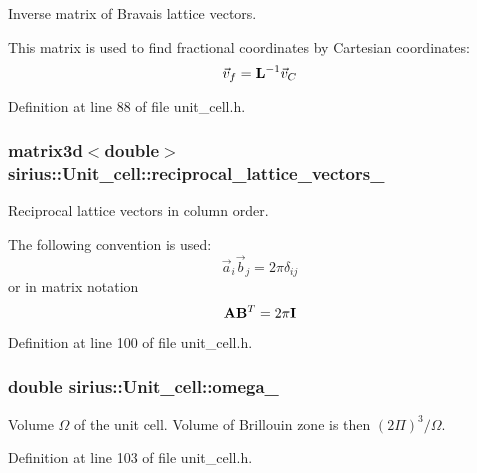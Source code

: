 Inverse matrix of Bravais lattice vectors. 

This matrix is used to find fractional coordinates by Cartesian coordinates\+: \[ \vec v_{f} = {\bf L}^{-1} \vec v_{C} \] 

Definition at line 88 of file unit\+\_\+cell.\+h.

\hypertarget{classsirius_1_1_unit__cell_af85417314eb39d09ad90de1414fc5bea}{}
\subsubsection[{reciprocal\+\_\+lattice\+\_\+vectors\+\_\+}]{\setlength{\rightskip}{0pt plus 5cm}matrix3d$<$double$>$ sirius\+::\+Unit\+\_\+cell\+::reciprocal\+\_\+lattice\+\_\+vectors\+\_\+\hspace{0.3cm}{\ttfamily [private]}}\label{classsirius_1_1_unit__cell_af85417314eb39d09ad90de1414fc5bea}


Reciprocal lattice vectors in column order. 

The following convention is used\+: \[ \vec a_{i} \vec b_{j} = 2 \pi \delta_{ij} \] or in matrix notation \[ {\bf A} {\bf B}^{T} = 2 \pi {\bf I} \] 

Definition at line 100 of file unit\+\_\+cell.\+h.

\hypertarget{classsirius_1_1_unit__cell_ac587c752016025de36db5ac4312112b4}{}
\subsubsection[{omega\+\_\+}]{\setlength{\rightskip}{0pt plus 5cm}double sirius\+::\+Unit\+\_\+cell\+::omega\+\_\+\hspace{0.3cm}{\ttfamily [private]}}\label{classsirius_1_1_unit__cell_ac587c752016025de36db5ac4312112b4}


Volume $ \Omega $ of the unit cell. Volume of Brillouin zone is then $ (2\Pi)^3 / \Omega $. 



Definition at line 103 of file unit\+\_\+cell.\+h.

